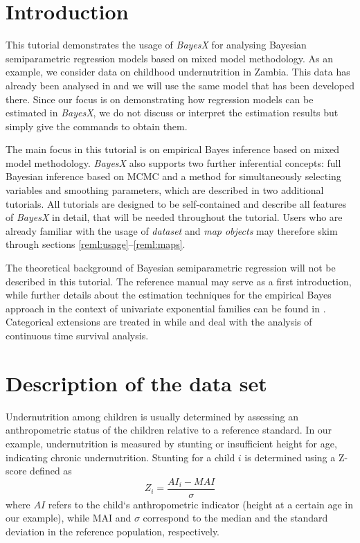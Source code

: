 \section{Introduction}\label{reml:data}

This tutorial demonstrates the usage of {\it BayesX} for analysing Bayesian semiparametric regression models based on mixed
model methodology. As an example, we consider data on childhood undernutrition in Zambia. This data has already been analysed
in  and we will use the same model that has been developed there. Since our focus is on demonstrating how
regression models can be estimated in {\it BayesX}, we do not discuss or interpret the estimation results but simply give the
commands to obtain them.

The main focus in this tutorial is on empirical Bayes inference based on mixed model methodology. {\it BayesX} also supports
two further inferential concepts: full Bayesian inference based on MCMC and a method for simultaneously selecting variables and
smoothing parameters, which are described in two additional tutorials. All tutorials are designed to be self-contained and
describe all features of {\it BayesX} in detail, that will be needed throughout the tutorial. Users who are already familiar
with the usage of {\it dataset} and {\it map objects} may therefore skim through sections \ref{reml:usage}--\ref{reml:maps}.

The theoretical background of Bayesian semiparametric regression will not be described in this tutorial. The reference manual
may serve as a first introduction, while further details about the estimation techniques for the empirical Bayes approach in
the context of univariate exponential families can be found in . Categorical extensions are treated in
 while  and  deal with the analysis of continuous time
survival analysis.

\section{Description of the data set}

Undernutrition among children is usually determined by assessing an anthropometric status of the children relative to a
reference standard. In our example, undernutrition is measured by stunting or insufficient height for age, indicating chronic
undernutrition. Stunting for a child $i$ is determined using a Z-score defined as
\[
Z_i = \frac{AI_i-MAI}{\sigma}
\]
where $AI$ refers to the child`s anthropometric indicator (height at a certain age in our example), while MAI and $\sigma$
correspond to the median and the standard deviation in the reference population, respectively.

